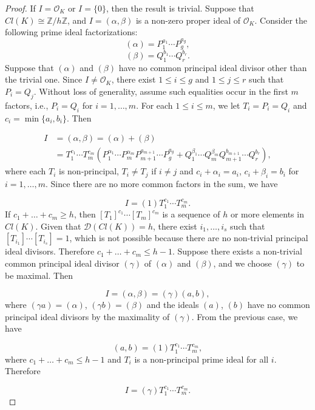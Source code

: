 \documentclass[10pt,a4paper]{amsart}
\begin{document}
\begin{proof}
   If $I=\mathcal{O}_K$ or $I=\{0\}$, then the result is trivial. Suppose that $Cl(K) \cong \mathbb{Z}/h\mathbb{Z}$, and $I=(\alpha,\beta)$ is a non-zero proper ideal of $\mathcal{O}_K$. Consider the following prime ideal factorizations:
\[ (\alpha) = P_1^{a_1} \cdots P_g^{a_g}, \]
\[ (\beta) = Q_1^{b_1} \cdots Q_r^{b_r}. \]
Suppose that $(\alpha)$ and $(\beta)$ have no common principal ideal divisor other than the trivial one. Since $I\neq \mathcal{O}_K$, there exist $1\leq i\leq g$ and $1\leq j\leq r$ such that $P_i=Q_j$. Without loss of generality, assume such equalities occur in the first $m$ factors, i.e., $P_i=Q_i$ for $i=1,\ldots, m$. For each $1\leq i\leq m$, we let $T_i=P_i=Q_i$ and $c_i=\min\{a_i,b_i\}$. Then

\begin{equation*}
\begin{split}
I &= (\alpha,\beta) = (\alpha) + (\beta) \\
  &= T_1^{c_1} \cdots T_m^{c_m} (P_1^{\alpha_1} \cdots P_m^{\alpha_m} P_{m+1}^{a_{m+1}} \cdots P_g^{a_g} + Q_1^{\beta_1} \cdots Q_m^{\beta_m} Q_{m+1}^{b_{m+1}} \cdots Q_r^{b_r}),
\end{split}
\end{equation*}
where each $T_i$ is non-principal, $T_i\neq T_j$ if $i\neq j$ and $c_i+\alpha_i=a_i$, $c_i+\beta_i=b_i$ for $i=1,\ldots, m$. Since there are no more common factors in the sum, we have

\[ I=(1)T_1^{c_1}\cdots T_m^{c_m}. \] 
If $c_1+\ldots+c_m\geq h$, then $[T_1]^{c_1}\cdots [T_m]^{c_m}$ is a sequence of $h$ or more elements in $Cl(K)$. Given that $\mathcal{D}(Cl(K))=h$, there exist $i_1,\ldots,i_s$ such that $[T_{i_1}]\cdots[T_{i_s}]=1$, which is not possible because there are no non-trivial principal ideal divisors. Therefore $c_1+\ldots+c_m\leq h-1$. Suppose there exists a non-trivial common principal ideal divisor $(\gamma)$ of $(\alpha)$ and $(\beta)$, and we choose $(\gamma)$ to be maximal. Then 

\[ I=(\alpha,\beta)=(\gamma)(a,b), \]
where $(\gamma a)=(\alpha)$, $(\gamma b)=(\beta)$ and the ideals $(a)$, $(b)$ have no common principal ideal divisors by the maximality of $(\gamma)$. From the previous case, we have 

\[ (a,b)=(1)T_1^{c_1}\cdots T_m^{c_m}, \]
where $c_1+\ldots+c_m\leq h-1$ and $T_i$ is a non-principal prime ideal for all $i$. Therefore 

\[ I=(\gamma)T_1^{c_1}\cdots T_m^{c_m}. \]
\end{proof}
\end{document}
